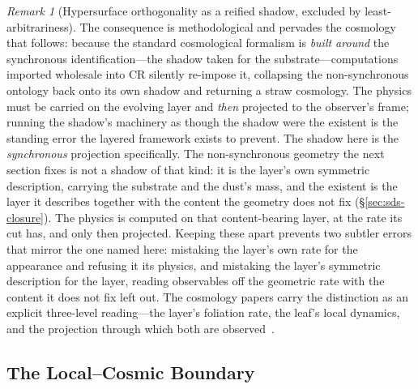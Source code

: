 \documentclass[11pt,a4paper]{article}
\theoremstyle{plain}
\theoremstyle{definition}
\theoremstyle{remark}
\newtheorem{remark}{Remark}
\begin{document}
\begin{remark}[Hypersurface orthogonality as a reified shadow, excluded by least-arbitrariness]
The consequence is methodological and pervades the cosmology that follows: because the standard cosmological formalism is \emph{built around} the synchronous identification---the shadow taken for the substrate---computations imported wholesale into CR silently re-impose it, collapsing the non-synchronous ontology back onto its own shadow and returning a straw cosmology. The physics must be carried on the evolving layer and \emph{then} projected to the observer's frame; running the shadow's machinery as though the shadow were the existent is the standing error the layered framework exists to prevent. The shadow here is the \emph{synchronous} projection specifically. The non-synchronous geometry the next section fixes is not a shadow of that kind: it is the layer's own symmetric description, carrying the substrate and the dust's mass, and the existent is the layer it describes together with the content the geometry does not fix (\S\ref{sec:sds-closure}). The physics is computed on that content-bearing layer, at the rate its cut has, and only then projected. Keeping these apart prevents two subtler errors that mirror the one named here: mistaking the layer's own rate for the appearance and refusing it its physics, and mistaking the layer's symmetric description for the layer, reading observables off the geometric rate with the content it does not fix left out. The cosmology papers carry the distinction as an explicit three-level reading---the layer's foliation rate, the leaf's local dynamics, and the projection through which both are observed~\cite{JanzenCRcosmology,JanzenCosmogenesis}.
\end{remark}

\subsection{The Local--Cosmic Boundary}\label{sec:CR-HEradius}
\end{document}
